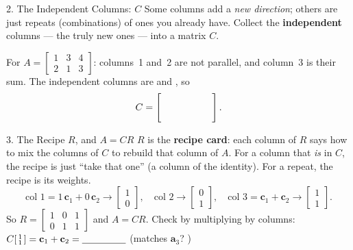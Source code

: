 \documentclass[10pt]{article}
\begin{document}
\begin{notesbox}{2. The Independent Columns: $C$}
Some columns add a \emph{new direction}; others are just repeats (combinations) of ones you already
have. Collect the \textbf{independent} columns --- the truly new ones --- into a matrix $C$.
\begin{center}
\end{center}
For $A=\begin{bmatrix} 1 & 3 & 4 \\ 2 & 1 & 3 \end{bmatrix}$: columns~1 and~2 are not parallel, and
column~3 is their sum. The independent columns are \blank{1.4cm} and \blank{1.4cm}, so
\[
  C=\begin{bmatrix}\ \rule{0.7cm}{0pt} & \rule{0.7cm}{0pt}\ \\[3pt] & \end{bmatrix}.
\]
\end{notesbox}

\begin{notesbox}{3. The Recipe $R$, and $A=CR$}
$R$ is the \textbf{recipe card}: each column of $R$ says how to mix the columns of $C$ to rebuild
that column of $A$. For a column that \emph{is} in $C$, the recipe is just ``take that one'' (a
column of the identity). For a repeat, the recipe is its weights.
\[
  \text{col 1}=1\,\mathbf{c}_1+0\,\mathbf{c}_2\to\begin{bmatrix} 1\\0 \end{bmatrix},\quad
  \text{col 2}\to\begin{bmatrix} 0\\1 \end{bmatrix},\quad
  \text{col 3}=\mathbf{c}_1+\mathbf{c}_2\to\begin{bmatrix} 1\\1 \end{bmatrix}.
\]
So $R=\begin{bmatrix} 1 & 0 & 1 \\ 0 & 1 & 1 \end{bmatrix}$ and $A=CR$. Check by multiplying by
columns: $C\begin{bsmallmatrix} 1\\1 \end{bsmallmatrix}=\mathbf{c}_1+\mathbf{c}_2=\blank{1.6cm}$
(matches $\mathbf{a}_3$? \writeline)
\end{notesbox}
\end{document}
